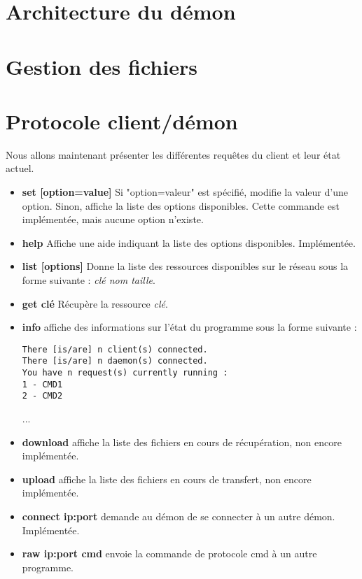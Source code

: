 	\section{Architecture du démon}
	
	\section{Gestion des fichiers}
	
    \section{Protocole client/démon}
    Nous allons maintenant présenter les différentes requêtes du client et leur état actuel.

\begin{itemize}
\item{\textbf{set [option=value]}} Si "option=valeur" est spécifié, modifie la valeur
d'une option. Sinon, affiche la liste des options disponibles. Cette commande
est implémentée, mais aucune option n'existe.

\item{\textbf{help}} Affiche une aide indiquant la liste des options
disponibles. Implémentée.

\item{\textbf{list [options]}} Donne la liste des ressources disponibles sur
le réseau sous la forme suivante : \textit{clé nom taille}.

\item{\textbf{get clé}} Récupère la ressource \textit{clé}.

\item{\textbf{info}} affiche des informations sur l'état du programme sous la
forme suivante :
\begin{verbatim}
There [is/are] n client(s) connected.
There [is/are] n daemon(s) connected.
You have n request(s) currently running :
1 - CMD1
2 - CMD2
\end{verbatim}
...

\item{\textbf{download}} affiche la liste des fichiers en cours de récupération, non encore implémentée.

\item{\textbf{upload}} affiche la liste des fichiers en cours de transfert, non encore implémentée.

\item{\textbf{connect ip:port}} demande au démon de se connecter à un autre
démon. Implémentée.

\item{\textbf{raw ip:port cmd}} envoie la commande de protocole cmd à un autre programme.

\end{itemize} 
	
